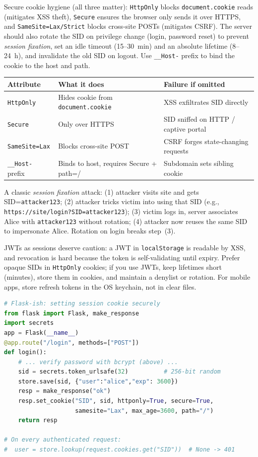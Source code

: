 Secure cookie hygiene (all three matter): \texttt{HttpOnly} blocks \texttt{document.cookie} reads (mitigates XSS theft), \texttt{Secure} ensures the browser only sends it over HTTPS, and \texttt{SameSite=Lax/Strict} blocks cross-site POSTs (mitigates CSRF). The server should also rotate the SID on privilege change (login, password reset) to prevent \emph{session fixation}, set an idle timeout (15--30~min) and an absolute lifetime (8--24~h), and invalidate the old SID on logout. Use \texttt{\_\_Host-} prefix to bind the cookie to the host and path.

\begin{center}
\small
\begin{tabular}{lll}
\toprule
Attribute & What it does & Failure if omitted\\
\midrule
\texttt{HttpOnly} & Hides cookie from \texttt{document.cookie} & XSS exfiltrates SID directly\\
\texttt{Secure} & Only over HTTPS & SID sniffed on HTTP / captive portal\\
\texttt{SameSite=Lax} & Blocks cross-site POST & CSRF forges state-changing requests\\
\texttt{\_\_Host-} prefix & Binds to host, requires Secure + path=/ & Subdomain sets sibling cookie\\
\bottomrule
\end{tabular}
\end{center}

A classic \emph{session fixation} attack: (1) attacker visits site and gets SID=\texttt{attacker123}; (2) attacker tricks victim into using that SID (e.g., \texttt{https://site/login?SID=attacker123}); (3) victim logs in, server associates Alice with \texttt{attacker123} without rotation; (4) attacker now reuses the same SID to impersonate Alice. Rotation on login breaks step~(3).

JWTs as sessions deserve caution: a JWT in \texttt{localStorage} is readable by XSS, and revocation is hard because the token is self-validating until expiry. Prefer opaque SIDs in \texttt{HttpOnly} cookies; if you use JWTs, keep lifetimes short (minutes), store them in cookies, and maintain a denylist or rotation. For mobile apps, store refresh tokens in the OS keychain, not in clear files.

\begin{lstlisting}[language=Python]
# Flask-ish: setting session cookie securely
from flask import Flask, make_response
import secrets
app = Flask(__name__)
@app.route("/login", methods=["POST"])
def login():
    # ... verify password with bcrypt (above) ...
    sid = secrets.token_urlsafe(32)          # 256-bit random
    store.save(sid, {"user":"alice","exp": 3600})
    resp = make_response("ok")
    resp.set_cookie("SID", sid, httponly=True, secure=True,
                    samesite="Lax", max_age=3600, path="/")
    return resp

# On every authenticated request:
#  user = store.lookup(request.cookies.get("SID"))  # None -> 401
\end{lstlisting}

